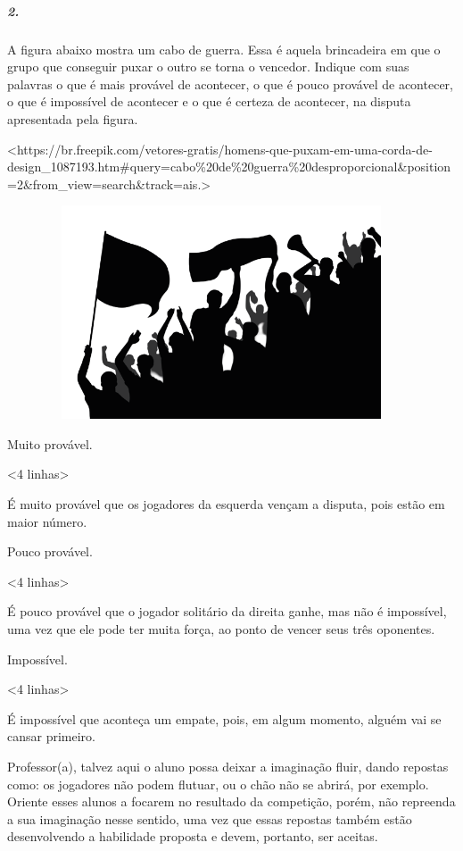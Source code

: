 \subparagraph{2.}\label{section-69}

A figura abaixo mostra um cabo de guerra. Essa é aquela brincadeira em
que o grupo que conseguir puxar o outro se torna o vencedor. Indique com
suas palavras o que é mais provável de acontecer, o que é pouco provável
de acontecer, o que é impossível de acontecer e o que é certeza de
acontecer, na disputa apresentada pela figura.

\textless{}https://br.freepik.com/vetores-gratis/homens-que-puxam-em-uma-corda-de-design\_1087193.htm\#query=cabo\%20de\%20guerra\%20desproporcional\&position=2\&from\_view=search\&track=ais.\textgreater{}

\includegraphics[width=5.00000in,height=2.48958in]{media/image84.png}

Muito provável.

\textless{}4 linhas\textgreater{}

É muito provável que os jogadores da esquerda vençam a disputa, pois
estão em maior número.

Pouco provável.

\textless{}4 linhas\textgreater{}

É pouco provável que o jogador solitário da direita ganhe, mas não é
impossível, uma vez que ele pode ter muita força, ao ponto de vencer seus três oponentes.

Impossível.

\textless{}4 linhas\textgreater{}

É impossível que aconteça um empate, pois, em algum momento, alguém vai se cansar primeiro.

Professor(a), talvez aqui o aluno possa deixar a imaginação fluir,
dando repostas como: os jogadores não podem flutuar, ou o chão não se
abrirá, por exemplo. Oriente esses alunos a focarem no resultado
da competição, porém, não repreenda a sua imaginação nesse sentido, uma
vez que essas repostas também estão desenvolvendo a habilidade proposta e devem, portanto, ser aceitas.

